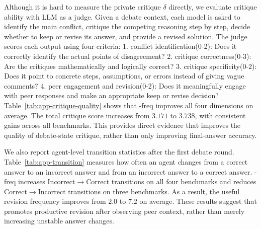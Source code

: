 Although it is hard to measure the private critique $\delta$ directly, we evaluate critique ability with LLM as a judge. Given a debate context, each model is asked to identify the main conflict, critique the competing reasoning step by step, decide whether to keep or revise its answer, and provide a revised solution. The judge scores each output using four criteria: 1. conflict identification(0-2): Does it correctly identify the actual points of disagreement? 2. critique correctness(0-3): Are the critiques mathematically and logically correct? 3. critique specificity(0-2): Does it point to concrete steps, assumptions, or errors instead of giving vague comments? 4. peer engagement and revision(0-2): Does it meaningfully engage with peer responses and make an appropriate keep or revise decision? Table~\ref{tab:app-critique-quality} shows that \SDRL{}-freq improves all four dimensions on average. The total critique score increases from $3.171$ to $3.738$, with consistent gains across all benchmarks. This provides direct evidence that \SDRL{} improves the quality of debate-state critique, rather than only improving final-answer accuracy.

We also report agent-level transition statistics after the first debate round. Table~\ref{tab:app-transition} measures how often an agent changes from a correct answer to an incorrect answer and from an incorrect answer to a correct answer. \SDRL{}-freq increases Incorrect$\to$Correct transitions on all four benchmarks and reduces Correct$\to$Incorrect transitions on three benchmarks. As a result, the useful revision frequency improves from $2.0$ to $7.2$ on average. These results suggest that \SDRL{} promotes productive revision after observing peer context, rather than merely increasing unstable answer changes.


